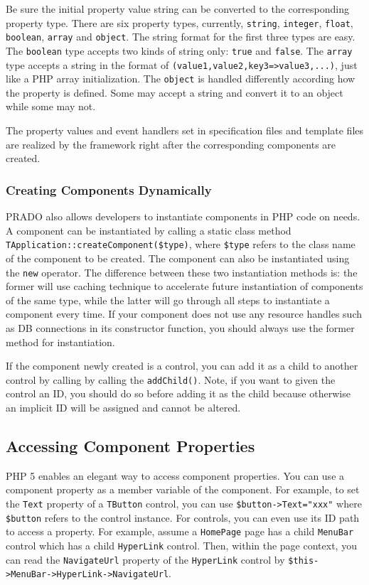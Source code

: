 \documentclass{book}
\begin{document}
Be sure the initial property value string can be converted to the
corresponding property type. There are six property types,
currently, \verb|string|, \verb|integer|, \verb|float|,
\verb|boolean|, \verb|array| and \verb|object|. The string format
for the first three types are easy. The \verb|boolean| type
accepts two kinds of string only: \verb|true| and \verb|false|.
The \verb|array| type accepts a string in the format of
\verb|(value1,value2,key3=>value3,...)|, just like a PHP array
initialization. The \verb|object| is handled differently according
how the property is defined. Some may accept a string and convert
it to an object while some may not.


The property values and event handlers set in specification files
and template files are realized by the framework right after the
corresponding components are created.


\subsubsection{Creating Components Dynamically}

PRADO also allows developers to instantiate components in PHP code
on needs. A component can be instantiated by calling a static
class method \verb|TApplication::createComponent($type)|, where
\verb|$type| refers to the class name of the component to be
created. The component can also be instantiated using the
\verb|new| operator. The difference between these two
instantiation methods is: the former will use caching technique to
accelerate future instantiation of components of the same type,
while the latter will go through all steps to instantiate a
component every time. If your component does not use any resource
handles such as DB connections in its constructor function, you
should always use the former method for instantiation.

If the component newly created is a control, you can add it as a
child to another control by calling by calling the
\verb|addChild()|. Note, if you want to given the control an ID,
you should do so before adding it as the child because otherwise
an implicit ID will be assigned and cannot be altered.


\subsection{Accessing Component Properties}

PHP 5 enables an elegant way to access component properties. You
can use a component property as a member variable of the
component. For example, to set the \verb|Text| property of a
\verb|TButton| control, you can use \verb|$button->Text="xxx"|
where \verb|$button| refers to the control instance. For controls,
you can even use its ID path to access a property. For example,
assume a \verb|HomePage| page has a child \verb|MenuBar| control
which has a child \verb|HyperLink| control. Then, within the page
context, you can read the \verb|NavigateUrl| property of the
\verb|HyperLink| control by
\verb|$this->MenuBar->HyperLink->NavigateUrl|.
\end{document}
